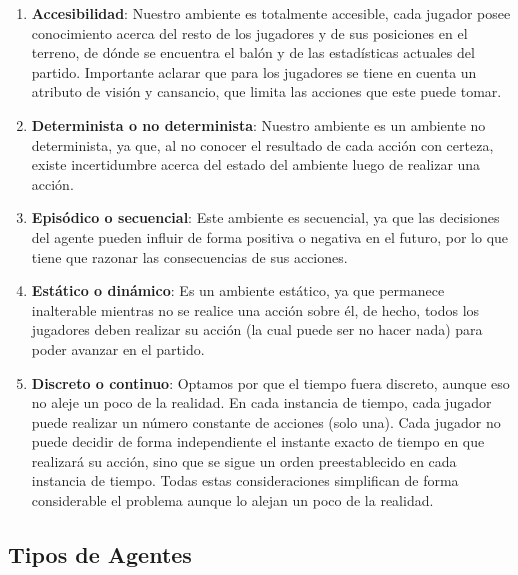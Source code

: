 \documentclass{article}
\begin{document}
\begin{enumerate}
      \item \textbf{Accesibilidad}: Nuestro ambiente es totalmente accesible, cada jugador posee conocimiento acerca del
            resto de los jugadores y de sus posiciones en el terreno, de dónde se encuentra el balón y de las estadísticas 
            actuales del partido. Importante aclarar que para los jugadores se tiene en cuenta un atributo de visión y 
            cansancio, que limita las acciones que este puede tomar.
            
      \item \textbf{Determinista o no determinista}: Nuestro ambiente es un ambiente no determinista, ya que, al no
            conocer el resultado de cada acción con certeza, existe incertidumbre acerca del estado del ambiente luego de 
            realizar una acción.
            
      \item \textbf{Episódico o secuencial}: Este ambiente es secuencial, ya que las decisiones del agente pueden
            influir de forma positiva o negativa en el futuro, por lo que tiene que razonar las consecuencias de sus acciones.
            
      \item \textbf{Estático o dinámico}: Es un ambiente estático, ya que permanece inalterable mientras no se
            realice una acción sobre él, de hecho, todos los jugadores deben realizar su acción (la cual puede ser no hacer 
            nada) para poder avanzar en el partido.
            
      \item \textbf{Discreto o continuo}: Optamos por que el tiempo fuera discreto, aunque eso no aleje un poco de la
            realidad. En cada instancia de tiempo, cada jugador puede realizar un número constante de acciones (solo una). 
            Cada jugador no puede decidir de forma independiente el instante exacto de tiempo en que realizará su acción, 
            sino que se sigue un orden preestablecido en cada instancia de tiempo. Todas estas consideraciones simplifican 
            de forma considerable el problema aunque lo alejan un poco de la realidad.
            
\end{enumerate}

\subsection{Tipos de Agentes}
\end{document}
